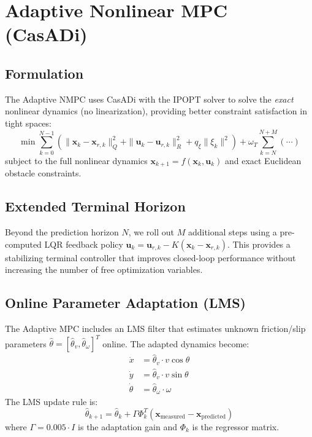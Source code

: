 \documentclass[12pt, a4paper]{article}
\begin{document}
\section{Adaptive Nonlinear MPC (CasADi)}

\subsection{Formulation}
The Adaptive NMPC uses CasADi with the IPOPT solver to solve the \emph{exact} nonlinear dynamics (no linearization), providing better constraint satisfaction in tight spaces:
\begin{equation}
    \min \sum_{k=0}^{N-1} \left( \|\mathbf{x}_k - \mathbf{x}_{r,k}\|_Q^2 + \|\mathbf{u}_k - \mathbf{u}_{r,k}\|_R^2 + q_\xi \|\xi_k\|^2 \right) + \omega_T \sum_{k=N}^{N+M} (\cdots)
\end{equation}
subject to the full nonlinear dynamics $\mathbf{x}_{k+1} = f(\mathbf{x}_k, \mathbf{u}_k)$ and exact Euclidean obstacle constraints.

\subsection{Extended Terminal Horizon}
Beyond the prediction horizon $N$, we roll out $M$ additional steps using a pre-computed LQR feedback policy $\mathbf{u}_k = \mathbf{u}_{r,k} - K(\mathbf{x}_k - \mathbf{x}_{r,k})$. This provides a stabilizing terminal controller that improves closed-loop performance without increasing the number of free optimization variables.

\subsection{Online Parameter Adaptation (LMS)}
The Adaptive MPC includes an LMS filter that estimates unknown friction/slip parameters $\hat{\theta} = [\hat{\theta}_v, \hat{\theta}_\omega]^T$ online. The adapted dynamics become:
\begin{align}
    \dot{x} &= \hat{\theta}_v \cdot v \cos\theta \\
    \dot{y} &= \hat{\theta}_v \cdot v \sin\theta \\
    \dot{\theta} &= \hat{\theta}_\omega \cdot \omega
\end{align}
The LMS update rule is:
\begin{equation}
    \hat{\theta}_{k+1} = \hat{\theta}_k + \Gamma \Phi_k^T (\mathbf{x}_{\text{measured}} - \mathbf{x}_{\text{predicted}})
\end{equation}
where $\Gamma = 0.005 \cdot I$ is the adaptation gain and $\Phi_k$ is the regressor matrix.
\end{document}
